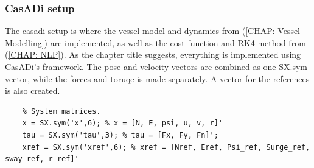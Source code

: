 \subsubsection*{CasADi setup}
The casadi setup is where the vessel model and dynamics from (\ref{CHAP: Vessel Modelling}) are implemented, as well as the cost function and \gls{RK4}
method from (\ref{CHAP: NLP}). As the chapter title suggests, everything is implemented using CasADi's framework. The pose and velocity vectors
are combined as one SX.sym vector, while the forces and toruqe is made separately. A vector for the references is also created.
\begin{lstlisting}
    % System matrices.
    x = SX.sym('x',6); % x = [N, E, psi, u, v, r]'
    tau = SX.sym('tau',3); % tau = [Fx, Fy, Fn]';
    xref = SX.sym('xref',6); % xref = [Nref, Eref, Psi_ref, Surge_ref, sway_ref, r_ref]'
\end{lstlisting}

